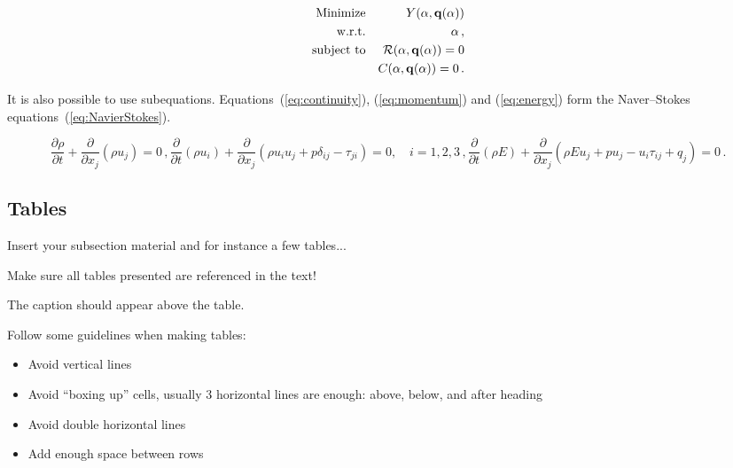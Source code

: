\begin{eqnarray}
  {\rm Minimize}   && Y({\bf \alpha},{\bf q}({\bf \alpha}))            \nonumber           \\
  {\rm w.r.t.}     && {\bf \alpha} \,,                                 \label{eq:minimize} \\
  {\rm subject~to} && {\cal R}({\bf \alpha},{\bf q}({\bf \alpha})) = 0 \nonumber           \\
                   &&       C ({\bf \alpha},{\bf q}({\bf \alpha})) = 0 \,. \nonumber
\end{eqnarray}

It is also possible to use subequations. Equations~(\ref{eq:continuity}), (\ref{eq:momentum}) and (\ref{eq:energy}) form the Naver--Stokes equations~(\ref{eq:NavierStokes}).

\begin{subequations}
    \begin{equation}
    \frac{\partial \rho}{\partial t} + \frac{\partial}{\partial x_j}\left( \rho u_j \right) = 0 \,,
    \label{eq:continuity}
    \end{equation}
    \begin{equation}
    \frac{\partial}{\partial t}\left( \rho u_i \right) + \frac{\partial}{\partial x_j} \left( \rho u_i u_j + p \delta_{ij} - \tau_{ji} \right) = 0, \quad i=1,2,3 \,,
    \label{eq:momentum}
    \end{equation}
    \begin{equation}
        \frac{\partial}{\partial t}\left( \rho E \right) + \frac{\partial}{\partial x_j} \left( \rho E u_j + p u_j - u_i \tau_{ij} + q_j \right) = 0 \,.
    \label{eq:energy}
    \end{equation}
\label{eq:NavierStokes}%
\end{subequations}


\subsection{Tables}
\label{section:tables}

Insert your subsection material and for instance a few tables...

Make sure all tables presented are referenced in the text!

The caption should appear above the table.

Follow some guidelines when making tables:

\begin{itemize}
  \item Avoid vertical lines
  \item Avoid “boxing up” cells, usually 3 horizontal lines are enough: above, below, and after heading
  \item Avoid double horizontal lines
  \item Add enough space between rows
\end{itemize}

